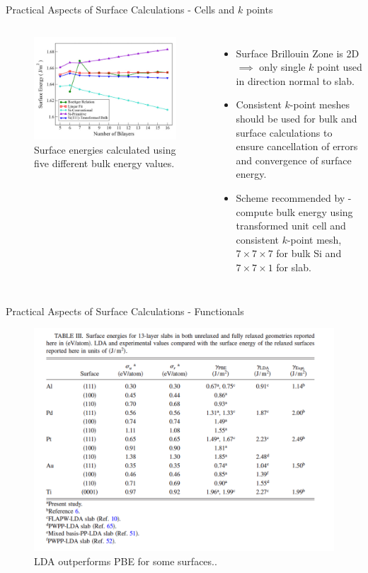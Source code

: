\documentclass[aspectratio=169]{beamer}
\begin{document}
\begin{frame}{Practical Aspects of Surface Calculations - Cells and $k$ points}
\begin{columns}
\begin{figure}
    \centering
    \includegraphics[width=\linewidth]{lectures/figures/11_surface_kpoints.png}
    \caption{Surface energies calculated using five different bulk energy values.\cite{sunEfficientCreationConvergence2013}}
\end{figure} 
\begin{itemize}
    \item Surface Brillouin Zone is 2D $\implies$ only single $k$ point used in direction normal to slab.
    \item Consistent $k$-point meshes should be used for bulk and surface calculations to ensure cancellation of errors and convergence of surface energy.
    \item Scheme recommended by \cite{sunEfficientCreationConvergence2013} - compute bulk energy using transformed unit cell and consistent $k$-point mesh, $7 \times 7 \times 7$ for bulk Si and $7 \times 7 \times 1$ for slab.
\end{itemize}
\end{columns} 

\end{frame} 

\begin{frame}{Practical Aspects of Surface Calculations - Functionals}
\begin{figure}
    \centering
    \includegraphics[width=0.5\linewidth]{lectures/figures/11_surface_functionals.png}
    \caption{LDA outperforms PBE for some surfaces.\cite{singh-millerSurfaceEnergiesWork2009}.}
\end{figure} 
\end{frame} 
\end{document}
